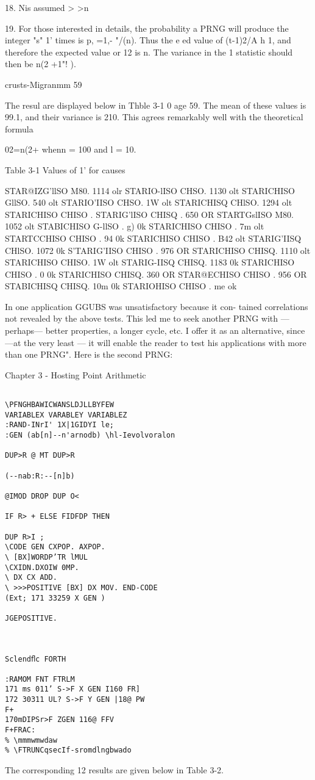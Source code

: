 18. Nis assumed > >n

19. For those interested in details, the probability a PRNG will produce the integer "s" 1' times is
p, =1,- "/(n). Thus the e ed value of (t-1)2/A h 1, and therefore the expected value or 12
is n. The variance in the 1 statistic should then be n(2 +1"! ).

crusts-Migranmm 59

The resul are displayed below in Thble 3-1 0 age 59. The mean
of these values is 99.1, and their variance is 210. This agrees
remarkably well with the theoretical formula

02=n(2+%
whenn = 100 and l = 10.

Table 3-1 Values of 1' for causes

 

STAR@IZG'llSO M80. 1114 olr STARIO-lISO CHSO. 1130 olt
STARICHISO GllSO. 540 olt STARIO'IISO CHSO. 1W olt
STARICHISQ CHlSO. 1294 olt STARICHISO CHISO . %
STARIG'lISO CHISQ . 650 OR STARTGslISO M80. 1052 olt
STABICHISO G-llSO . g) 0k STARICHISO CHISO . 7m olt
STARTCCHISO CHISO . 94 0k STARICHISO CHISO . B42 olt
STARIG'IISQ CHlSO. 1072 0k S'TARIG'IISO CHISO . 976 OR
STARICHISO CHISQ. 1110 olt STARICHISO CHISO. 1W olt
STARIG-IISQ CHISQ. 1183 0k STARICHISO CHISO . $0$ 0k
STARICHISO CHISQ. 360 OR STAR@ECHISO CHISO . 956 OR
STABICHISQ CHISQ. 10m 0k STARIOHISO CHISO . me ok

 

 

 

In one application GGUBS was unsatisfactory because it con-
tained correlations not revealed by the above tests. This led me
to seek another PRNG with —perhaps— better properties, a
longer cycle, etc. I offer it as an alternative, since —at the very
least — it will enable the reader to test his applications with more
than one PRNG". Here is the second PRNG:

Chapter 3 - Hosting Point Arithmetic
\begin{verbatim}

\PFNGHBAWICWANSLDJLLBYFEW
VARIABLEX VARABLEY VARIABLEZ
:RAND-INrI' 1X|1GIDYI le;
:GEN (ab[n]--n'arnodb) \hl-Ievolvoralon

DUP>R @ MT DUP>R

(--nab:R:--[n]b)

@IMOD DROP DUP O<

IF R> + ELSE FIDFDP THEN

DUP R>I ;
\CODE GEN CXPOP. AXPOP.
\ [BX]WORDP’TR lMUL
\CXIDN.DXOIW 0MP.
\ DX CX ADD.
\ >>>POSITIVE [BX] DX MOV. END-CODE
(Ext; 171 33259 X GEN )

JGEPOSITIVE.

 

Sclendﬂc FORTH

:RAMOM FNT FTRLM
171 ms 011’ S->F X GEN I160 FR]
172 30311 UL? S->F Y GEN |18@ PW
F+
170mDIPSr>F ZGEN 116@ FFV
F+FRAC:
% \mmmwmwdaw
% \FTRUNCqsecIf-sromdlngbwado
\end{verbatim}
The corresponding 12 results are given below in Table 3-2.

